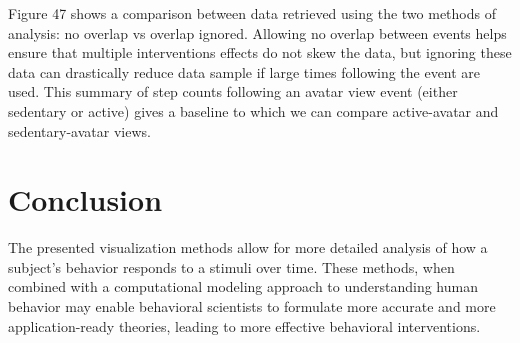\documentclass[preprint,journal]{vgtc}       %
\begin{document}
Figure 47 shows a comparison between data retrieved using the two methods of analysis: no overlap vs overlap ignored. 
Allowing no overlap between events helps ensure that multiple interventions effects do not skew the data, but ignoring these data can drastically reduce data sample if large times following the event are used. 
This summary of step counts following an avatar view event (either sedentary or active) gives a baseline to which we can compare active-avatar and sedentary-avatar views.


\section{Conclusion}
The presented visualization methods allow for more detailed analysis of how a subject’s behavior responds to a stimuli over time. 
These methods, when combined with a computational modeling approach to understanding human behavior may enable behavioral scientists to formulate more accurate and more application-ready theories, leading to more effective behavioral interventions. 




\end{document}
